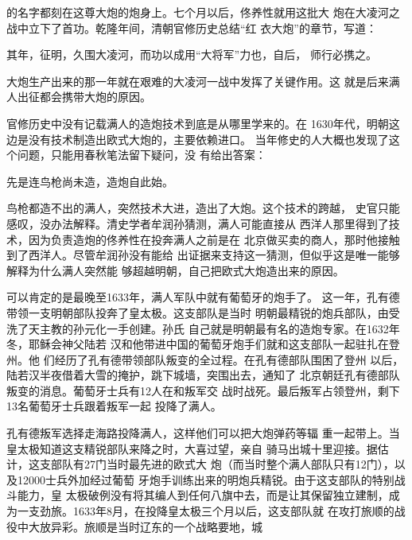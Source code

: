 的名字都刻在这尊大炮的炮身上。七个月以后，佟养性就用这批大%
炮在大凌河之战中立下了首功。乾隆年间，清朝官修历史总结“红%
衣大炮”的章节，写道：%
\par
{\bookkai 其年，征明，久围大凌河，而功以成用“大将军”力也，自后，}%
{\bookkai 师行必携之。}{\bookkai {}}%
\par
大炮生产出来的那一年就在艰难的大凌河一战中发挥了关键作用。这%
就是后来满人出征都会携带大炮的原因。%
\par
官修历史中没有记载满人的造炮技术到底是从哪里学来的。在%
1630年代，明朝这边是没有技术制造出欧式大炮的，主要依赖进口。%
当年修史的人大概也发现了这个问题，只能用春秋笔法留下疑问，没%
有给出答案：%
\par
{\bookkai 先是连鸟枪尚未造，造炮自此始。}%
\par
鸟枪都造不出的满人，突然技术大进，造出了大炮。这个技术的跨越，%
史官只能感叹，没办法解释。清史学者牟润孙猜测，满人可能直接从%
西洋人那里得到了技术，因为负责造炮的佟养性在投奔满人之前是在%
北京做买卖的商人，那时他接触到了西洋人。尽管牟润孙没有能给%
出证据来支持这一猜测，但似乎这是唯一能够解释为什么满人突然能%
够超越明朝，自己把欧式大炮造出来的原因。%
\par
可以肯定的是最晚至1633年，满人军队中就有葡萄牙的炮手了。%
这一年，孔有德带领一支明朝部队投奔了皇太极。这支部队是当时%
明朝最精锐的炮兵部队，由受洗了天主教的孙元化一手创建。孙氏%
自己就是明朝最有名的造炮专家。在1632年冬，耶稣会神父陆若%
汉和他带进中国的葡萄牙炮手们就和这支部队一起驻扎在登州。他%
们经历了孔有德带领部队叛变的全过程。在孔有德部队围困了登州%
以后，陆若汉半夜借着大雪的掩护，跳下城墙，突围出去，通知了%
北京朝廷孔有德部队叛变的消息。葡萄牙士兵有12人在和叛军交%
战时战死。最后叛军占领登州，剩下13名葡萄牙士兵跟着叛军一起%
投降了满人。%
\par
孔有德叛军选择走海路投降满人，这样他们可以把大炮弹药等辐%
重一起带上。当皇太极知道这支精锐部队来降之时，大喜过望，亲自%
骑马出城十里迎接。据估计，这支部队有27门当时最先进的欧式大%
炮（而当时整个满人部队只有12门），以及12000士兵外加经过葡萄%
牙炮手训练出来的明炮兵精锐。由于这支部队的特别战斗能力，皇%
太极破例没有将其编人到任何八旗中去，而是让其保留独立建制，成%
为一支劲旅。1633年8月，在投降皇太极三个月以后，这支部队就%
在攻打旅顺的战役中大放异彩。旅顺是当时辽东的一个战略要地，城%
